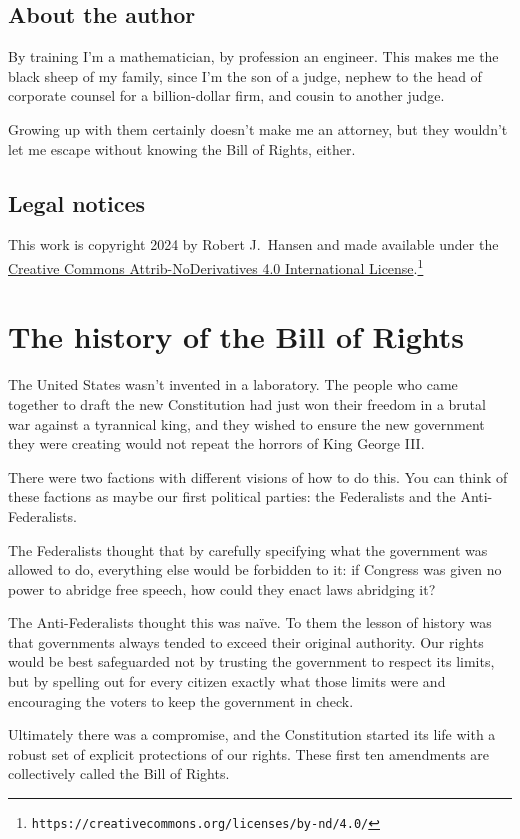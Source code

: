 \documentclass[10pt]{article}
\begin{document}
\subsection{About the author}
By training I'm a mathematician, by profession an engineer.  This makes me the black sheep of my family, since I'm the son of a judge, nephew to the head of corporate counsel for a billion-dollar firm, and cousin to another judge.

Growing up with them certainly doesn't make me an attorney, but they wouldn't let me escape without knowing the Bill of Rights, either.

\subsection{Legal notices}
This work is copyright \textcopyright{} 2024 by Robert J.~Hansen and made available under the \href{https://creativecommons.org/licenses/by-nd/4.0/}{Creative Commons Attrib-NoDerivatives 4.0 International License}.\footnote{\tt https://creativecommons.org/licenses/by-nd/4.0/}

\section{The history of the Bill of Rights}
The United States wasn't invented in a laboratory.  The people who came together to draft the new Constitution had just won their freedom in a brutal war against a tyrannical king, and they wished to ensure the new government they were creating would not repeat the horrors of King George III.

There were two factions with different visions of how to do this.  You can think of these factions as maybe our first political parties: the Federalists and the Anti-Federalists.

The Federalists thought that by carefully specifying what the government was allowed to do, everything else would be forbidden to it: if Congress was given no power to abridge free speech, how could they enact laws abridging it?

The Anti-Federalists thought this was na\"{i}ve.  To them the lesson of history was that governments always tended to exceed their original authority.  Our rights would be best safeguarded not by trusting the government to respect its limits, but by spelling out for every citizen exactly what those limits were and encouraging the voters to keep the government in check.

Ultimately there was a compromise, and the Constitution started its life with a robust set of explicit protections of our rights.  These first ten amendments are collectively called the Bill of Rights.
\end{document}
